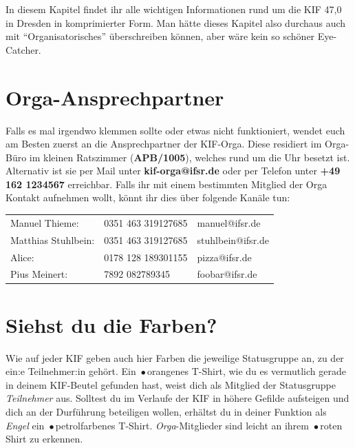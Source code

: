 
In diesem Kapitel findet ihr alle wichtigen Informationen rund um die KIF 47,0 in Dresden in komprimierter Form.
Man hätte dieses Kapitel also durchaus auch mit ``Organisatorisches'' überschreiben können, aber wäre kein so schöner Eye-Catcher.

\section*{Orga-Ansprechpartner}

Falls es mal irgendwo klemmen sollte oder etwas nicht funktioniert, wendet euch am Besten zuerst an die Ansprechpartner der KIF-Orga.
Diese residiert im Orga-Büro im kleinen Ratszimmer (\textbf{APB/1005}), welches rund um die Uhr besetzt ist.
Alternativ ist sie per Mail unter \textbf{kif-orga@ifsr.de} oder per Telefon unter \textbf{+49 162 1234567} erreichbar.
Falls ihr mit einem bestimmten Mitglied der Orga Kontakt aufnehmen wollt, könnt ihr dies über folgende Kanäle tun:

\vspace{.5cm}

\begin{tabular}{l l l}
Manuel Thieme:      & 0351 463 319127685 & manuel@ifsr.de \\[.05cm]
Matthias Stuhlbein: & 0351 463 319127685 & stuhlbein@ifsr.de \\[.05cm]
Alice:              & 0178 128 189301155 & pizza@ifsr.de \\[.05cm]
Pius Meinert:       & 7892 082789345     & foobar@ifsr.de
\end{tabular}

\section*{Siehst du die Farben?}

Wie auf jeder KIF geben auch hier Farben die jeweilige Statusgruppe an, zu der ein:e Teilnehmer:in gehört.
Ein {\,\color{KIFteal}$\bullet$\,}orangenes T-Shirt, wie du es vermutlich gerade in deinem KIF-Beutel gefunden hast, weist dich als Mitglied der Statusgruppe \emph{Teilnehmer} aus.
Solltest du im Verlaufe der KIF in höhere Gefilde aufsteigen und dich an der Durführung beteiligen wollen, erhältst du in deiner Funktion als \emph{Engel} ein {\,\color{KIFteal}$\bullet$\,}petrolfarbenes T-Shirt.
\emph{Orga}-Mitglieder sind leicht an ihrem {\,\color{KIFteal}$\bullet$\,}roten Shirt zu erkennen.

